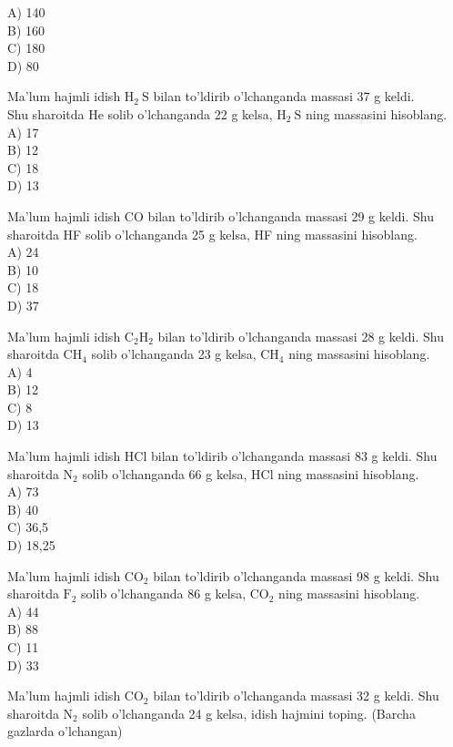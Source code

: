 A) 140\\
B) 160\\
C) 180\\
D) 80
  \item Ma'lum hajmli idish $\mathrm{H}_{2} \mathrm{~S}$ bilan to'ldirib o'lchanganda massasi 37 g keldi.\\
Shu sharoitda He solib o'lchanganda 22 g kelsa, $\mathrm{H}_{2} \mathrm{~S}$ ning massasini hisoblang.\\
A) 17\\
B) 12\\
C) 18\\
D) 13
  \item Ma'lum hajmli idish CO bilan to'ldirib o'lchanganda massasi 29 g keldi. Shu sharoitda HF solib o'lchanganda 25 g kelsa, HF ning massasini hisoblang.\\
A) 24\\
B) 10\\
C) 18\\
D) 37
  \item Ma'lum hajmli idish $\mathrm{C}_{2} \mathrm{H}_{2}$ bilan to'ldirib o'lchanganda massasi 28 g keldi. Shu sharoitda $\mathrm{CH}_{4}$ solib o'lchanganda 23 g kelsa, $\mathrm{CH}_{4}$ ning massasini hisoblang.\\
A) 4\\
B) 12\\
C) 8\\
D) 13
  \item Ma'lum hajmli idish HCl bilan to'ldirib o'lchanganda massasi 83 g keldi. Shu sharoitda $\mathrm{N}_{2}$ solib o'lchanganda 66 g kelsa, HCl ning massasini hisoblang.\\
A) 73\\
B) 40\\
C) 36,5\\
D) 18,25
  \item Ma'lum hajmli idish $\mathrm{CO}_{2}$ bilan to'ldirib o'lchanganda massasi 98 g keldi. Shu sharoitda $\mathrm{F}_{2}$ solib o'lchanganda 86 g kelsa, $\mathrm{CO}_{2}$ ning massasini hisoblang.\\
A) 44\\
B) 88\\
C) 11\\
D) 33
  \item Ma'lum hajmli idish $\mathrm{CO}_{2}$ bilan to'ldirib o'lchanganda massasi 32 g keldi. Shu sharoitda $\mathrm{N}_{2}$ solib o'lchanganda 24 g kelsa, idish hajmini toping. (Barcha gazlarda o'lchangan)\\
